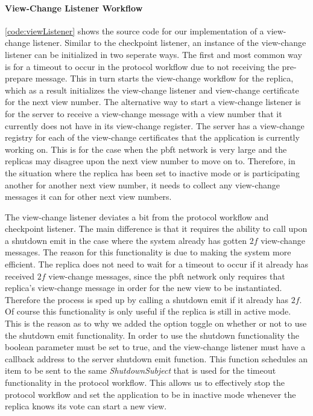 \paragraph{View-Change Listener Workflow}
\label{sec:viewchangeListener}
\autoref{code:viewListener} shows the source code for our implementation of a view-change listener. Similar to the checkpoint listener, an instance of the view-change listener can be initialized in two seperate ways. The first and most common way is for a timeout to occur in the protocol workflow due to not receiving the pre-prepare message. This in turn starts the view-change workflow for the replica, which as a result initializes the view-change listener and view-change certificate for the next view number. The alternative way to start a view-change listener is for the server to receive a view-change message with a view number that it currently does not have in its view-change register. The server has a view-change registry for each of the view-change certificates that the application is currently working on. This is for the case when the \ac{pbft} network is very large and the replicas may disagree upon the next view number to move on to. Therefore, in the situation where the replica has been set to inactive mode or is participating another for another next view number, it needs to collect any view-change messages it can for other next view numbers.

The view-change listener deviates a bit from the protocol workflow and checkpoint listener. The main difference is that it requires the ability to call upon a shutdown emit in the case where the system already has gotten $2f$ view-change messages. The reason for this functionality is due to making the system more efficient. The replica does not need to wait for a timeout to occur if it already has received $2f$ view-change messages, since the \ac{pbft} network only requires that replica's view-change message in order for the new view to be instantiated. Therefore the process is sped up by calling a shutdown emit if it already has $2f$. Of course this functionality is only useful if the replica is still in active mode. This is the reason as to why we added the option toggle on whether or not to use the shutdown emit functionality. In order to use the shutdown functionality the boolean parameter  must be set to true, and the view-change listener must have a callback address to the server shutdown emit function. This function schedules an item to be sent to the same  \emph{ShutdownSubject} that is used for the timeout functionality in the protocol workflow. This allows us to effectively stop the protocol workflow and set the application to be in inactive mode whenever the replica knows its vote can start a new view. 

